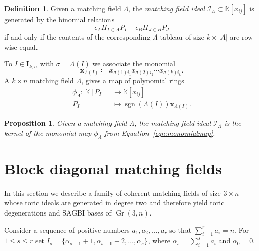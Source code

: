 \documentclass[10pt]{amsart}
\newtheorem{Proposition}[theo]{Proposition}
\theoremstyle{definition}
\newtheorem{Definition}[theo]{Definition}
\DeclareMathOperator{\Gr}{Gr}
\DeclareMathOperator{\sgn}{sgn}
\begin{document}
\begin{Definition}
Given a matching field $\Lambda$, the \emph{matching field ideal} $\mathcal{I}_{\Lambda} \subset \mathbb{K}[x_{ij}]$ is generated by the 
 binomial relations 
\begin{equation}\label{eq:binomials}
\epsilon_A \Pi_{I \in A} P_I - \epsilon_B \Pi_{J \in B} P_J
\end{equation}
if and only if the contents of the corresponding $\Lambda$-tableau of size $k \times |A|$ are row-wise equal.
\end{Definition}

To $I \in \mathbf{I}_{k, n}$ {with $\sigma=\Lambda(I)$} we associate the monomial 
\[ 
\mathbf{x}_{\Lambda(I)}\coloneqq x_{\sigma(1) i_{1}}x_{\sigma(2)i_2}\cdots x_{{\sigma(k)i_k}}. 
 \]
A $k\times n$ matching field $\Lambda$, 
gives a map of polynomial rings 
\begin{equation}\label{eqn:monomialmap}
\begin{aligned}
\phi_{\Lambda} \colon\ \mathbb{K}[P_I] &\rightarrow \mathbb{K}[x_{ij}] 
\\ 
 P_{I} &\mapsto \sgn(\Lambda(I)) \mathbf{x}_{\Lambda(I)}.
\end{aligned}
\end{equation}

\smallskip



\begin{Proposition}
Given a matching field $\Lambda$, the matching field ideal $\mathcal{I}_{\Lambda}$ is the kernel of the monomial map
$\phi_{\Lambda}$ from Equation~\eqref{eqn:monomialmap}. 
\end{Proposition}


\setcounter{section}{3}
\section{Block diagonal matching fields}\label{sec:block}

In this section we describe a family of coherent matching fields of size $3 \times n$ whose toric ideals are generated in degree two and therefore yield toric degenerations and SAGBI bases of $\Gr(3,n)$. 



Consider a sequence of positive numbers $ a_1, a_2, \ldots, a_{r}$ so that $\sum_{i = 1}^r a_i = n$. For $1 \leq s\leq r$ set 
$I_s = \{\alpha_{s-1}+1, \alpha_{s-1} +2, \ldots, \alpha_{s}\}$,
where $\alpha_{s} = \sum_{i = 1}^{s} a_{i }$ and $\alpha_0 = 0$. 
\end{document}

